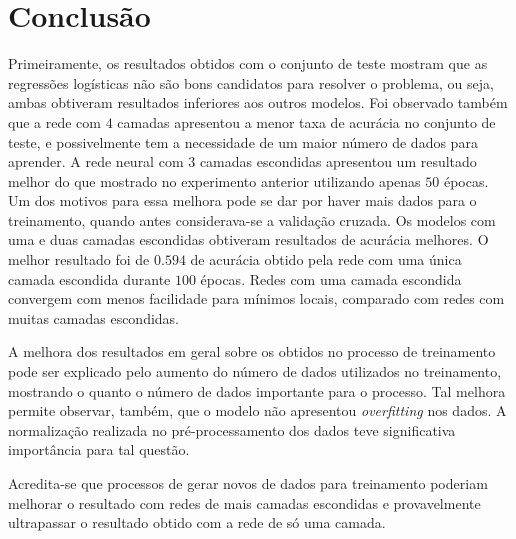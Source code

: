 \documentclass[conference]{IEEEtran}
\begin{document}
\section{Conclusão}

Primeiramente, os resultados obtidos com o conjunto de teste mostram que as regressões logísticas não são bons candidatos para resolver o problema, ou seja, ambas obtiveram resultados inferiores aos outros modelos. Foi observado também que a rede com $4$ camadas apresentou a menor taxa de acurácia no conjunto de teste, e possivelmente tem a necessidade de um maior número de dados para aprender. A rede neural com $3$ camadas escondidas apresentou um resultado melhor do que mostrado no experimento anterior utilizando apenas $50$ épocas. Um dos motivos para essa melhora pode se dar por haver mais dados para o treinamento, quando antes considerava-se a validação cruzada. Os modelos com uma e duas camadas escondidas obtiveram resultados de acurácia melhores. O melhor resultado foi de $0.594$ de acurácia obtido pela rede com uma única camada escondida durante $100$ épocas. Redes com uma camada escondida convergem com menos facilidade para mínimos locais, comparado com redes com muitas camadas escondidas.

A melhora dos resultados em geral sobre os obtidos no processo de treinamento pode ser explicado pelo aumento do número de dados utilizados no treinamento, mostrando o quanto o número de dados importante para o processo. Tal melhora permite observar, também, que o modelo não apresentou \emph{overfitting} nos dados. A normalização realizada no pré-processamento dos dados teve significativa importância para tal questão.

Acredita-se que processos de gerar novos de dados para treinamento poderiam melhorar o resultado com redes de mais camadas escondidas e provavelmente ultrapassar o resultado obtido com a rede de só uma camada.
\end{document}
